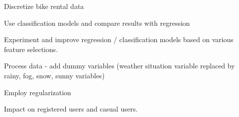 \documentclass[12pt]{article}
\newcommand{\bibfile}{GroupProject}
\begin{document}
\begin{packedlist}
\item Discretize bike rental data 
\item Use classification models and compare results with regression
\item Experiment and improve regression / classification models based on various feature selections.
\item Process data - add dummy variables (weather situation variable replaced by rainy, fog, snow, sunny variables)
\item Employ regularization
\item Impact on registered users and casual users.
\end{packedlist}



\end{document}

